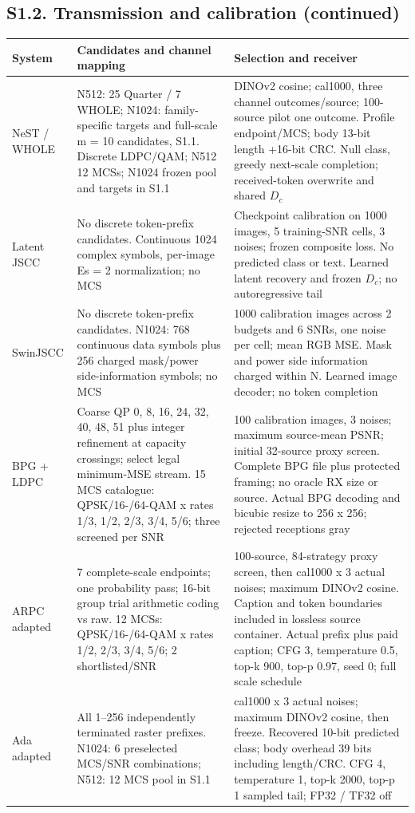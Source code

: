 \clearpage\subsection*{S1.2. Transmission and calibration (continued)}
\small\renewcommand{\arraystretch}{1.1}
\begin{longtable}{p{0.9in}p{2.5in}p{2.75in}}\toprule
System & Candidates and channel mapping & Selection and receiver\\\midrule\endhead
NeST / WHOLE & N512: 25 Quarter / 7 WHOLE; N1024: family-specific targets and full-scale m = 10 candidates, S1.1. Discrete LDPC/QAM; N512 12 MCSs; N1024 frozen pool and targets in S1.1 & DINOv2 cosine; cal1000, three channel outcomes/source; 100-source pilot one outcome. Profile endpoint/MCS; body 13-bit length +16-bit CRC. Null class, greedy next-scale completion; received-token overwrite and shared $D_c$\\[6pt]
Latent JSCC & No discrete token-prefix candidates. Continuous 1024 complex symbols, per-image Es = 2 normalization; no MCS & Checkpoint calibration on 1000 images, 5 training-SNR cells, 3 noises; frozen composite loss. No predicted class or text. Learned latent recovery and frozen $D_c$; no autoregressive tail\\[6pt]
SwinJSCC & No discrete token-prefix candidates. N1024: 768 continuous data symbols plus 256 charged mask/power side-information symbols; no MCS & 1000 calibration images across 2 budgets and 6 SNRs, one noise per cell; mean RGB MSE. Mask and power side information charged within N. Learned image decoder; no token completion\\[6pt]
BPG + LDPC & Coarse QP 0, 8, 16, 24, 32, 40, 48, 51 plus integer refinement at capacity crossings; select legal minimum-MSE stream. 15 MCS catalogue: QPSK/16-/64-QAM x rates 1/3, 1/2, 2/3, 3/4, 5/6; three screened per SNR & 100 calibration images, 3 noises; maximum source-mean PSNR; initial 32-source proxy screen. Complete BPG file plus protected framing; no oracle RX size or source. Actual BPG decoding and bicubic resize to 256 x 256; rejected receptions gray\\[6pt]
ARPC adapted & 7 complete-scale endpoints; one probability pass; 16-bit group trial arithmetic coding vs raw. 12 MCSs: QPSK/16-/64-QAM x rates 1/2, 2/3, 3/4, 5/6; 2 shortlisted/SNR & 100-source, 84-strategy proxy screen, then cal1000 x 3 actual noises; maximum DINOv2 cosine. Caption and token boundaries included in lossless source container. Actual prefix plus paid caption; CFG 3, temperature 0.5, top-k 900, top-p 0.97, seed 0; full scale schedule\\[6pt]
Ada adapted & All 1--256 independently terminated raster prefixes. N1024: 6 preselected MCS/SNR combinations; N512: 12 MCS pool in S1.1 & cal1000 x 3 actual noises; maximum DINOv2 cosine, then freeze. Recovered 10-bit predicted class; body overhead 39 bits including length/CRC. CFG 4, temperature 1, top-k 2000, top-p 1 sampled tail; FP32 / TF32 off\\[6pt]
\bottomrule\end{longtable}\normalsize
